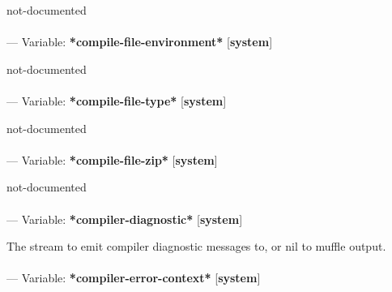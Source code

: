 \begin{adjustwidth}{5em}{5em}
not-documented
\end{adjustwidth}

\paragraph{}
\label{SYSTEM:*COMPILE-FILE-ENVIRONMENT*}
--- Variable: \textbf{*compile-file-environment*} [\textbf{system}] \textit{}

\begin{adjustwidth}{5em}{5em}
not-documented
\end{adjustwidth}

\paragraph{}
\label{SYSTEM:*COMPILE-FILE-TYPE*}
--- Variable: \textbf{*compile-file-type*} [\textbf{system}] \textit{}

\begin{adjustwidth}{5em}{5em}
not-documented
\end{adjustwidth}

\paragraph{}
\label{SYSTEM:*COMPILE-FILE-ZIP*}
--- Variable: \textbf{*compile-file-zip*} [\textbf{system}] \textit{}

\begin{adjustwidth}{5em}{5em}
not-documented
\end{adjustwidth}

\paragraph{}
\label{SYSTEM:*COMPILER-DIAGNOSTIC*}
--- Variable: \textbf{*compiler-diagnostic*} [\textbf{system}] \textit{}

\begin{adjustwidth}{5em}{5em}
The stream to emit compiler diagnostic messages to, or nil to muffle output.
\end{adjustwidth}

\paragraph{}
\label{SYSTEM:*COMPILER-ERROR-CONTEXT*}
--- Variable: \textbf{*compiler-error-context*} [\textbf{system}] \textit{}


